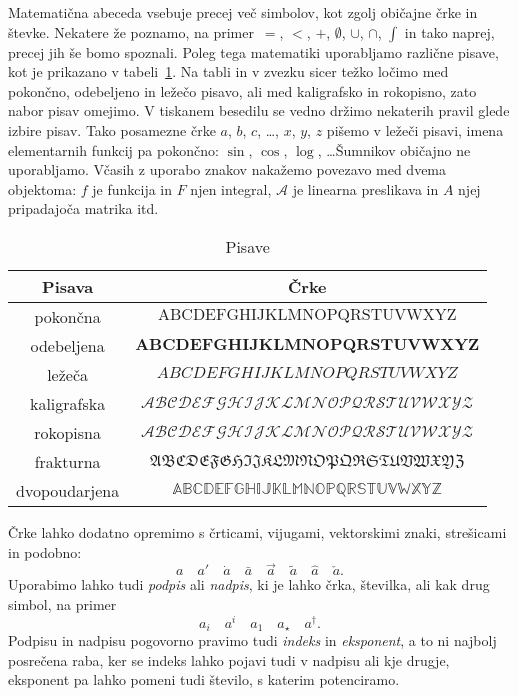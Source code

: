 Matematična abeceda vsebuje precej več simbolov, kot zgolj običajne črke in števke. Nekatere že poznamo, na primer~$=$, $<$, $+$, $\emptyset$, $\cup$, $\cap$, $\int$ in tako naprej, precej jih še bomo spoznali. Poleg tega matematiki uporabljamo različne pisave, kot je prikazano v tabeli~\ref{tabela:oblike-crk}. Na tabli in v zvezku sicer težko ločimo med pokončno, odebeljeno in ležečo pisavo, ali med kaligrafsko in rokopisno, zato nabor pisav omejimo. V tiskanem besedilu se vedno držimo nekaterih pravil glede izbire pisav. Tako posamezne črke $a$, $b$, $c$, \ldots, $x$, $y$, $z$ pišemo v ležeči pisavi, imena elementarnih funkcij pa pokončno: $\sin$, $\cos$, $\log$, \ldots Šumnikov običajno ne uporabljamo. Včasih z uporabo znakov nakažemo povezavo med dvema objektoma: $f$ je funkcija in $F$ njen integral, $\mathcal{A}$ je linearna preslikava in $A$ njej pripadajoča matrika itd.

\begin{table}[ht]
\centering
\begin{tabular}{c|c}
\textbf{Pisava} & \textbf{Črke} \\
\hline
pokončna & $\mathrm{ABCDEFGHIJKLMNOPQRSTUVWXYZ}$ \\
odebeljena & $\mathbf{ABCDEFGHIJKLMNOPQRSTUVWXYZ}$ \\
ležeča & $ABCDEFGHIJKLMNOPQRSTUVWXYZ$ \\
kaligrafska & $\mathcal{ABCDEFGHIJKLMNOPQRSTUVWXYZ}$ \\
rokopisna & $\mathscr{ABCDEFGHIJKLMNOPQRSTUVWXYZ}$ \\
frakturna & $\mathfrak{ABCDEFGHIJKLMNOPQRSTUVWXYZ}$ \\
dvopoudarjena & $\mathbb{ABCDEFGHIJKLMNOPQRSTUVWXYZ}$
\end{tabular}
\caption{Pisave}\label{tabela:oblike-crk}
\end{table}

Črke lahko dodatno opremimo s črticami, vijugami, vektorskimi znaki, strešicami in podobno:
%
\begin{equation*}
 a \quad
 a' \quad
 \dot{a} \quad
 \bar{a} \quad
 \vec{a} \quad
 \tilde{a} \quad
 \hat{a} \quad
 \check{a}.
\end{equation*}
%
Uporabimo lahko tudi \emph{podpis} ali
\emph{nadpis}, ki je lahko črka, številka, ali kak drug simbol, na primer
%
\begin{equation*}
  a_i \quad
  a^i \quad
  a_1 \quad
  a_{\star} \quad
  a^{\dagger}.
\end{equation*}
%
Podpisu in nadpisu pogovorno pravimo tudi \emph{indeks} in \emph{eksponent}, a to ni
najbolj posrečena raba, ker se indeks lahko pojavi tudi v nadpisu ali kje drugje,
eksponent pa lahko pomeni tudi število, s katerim potenciramo.

